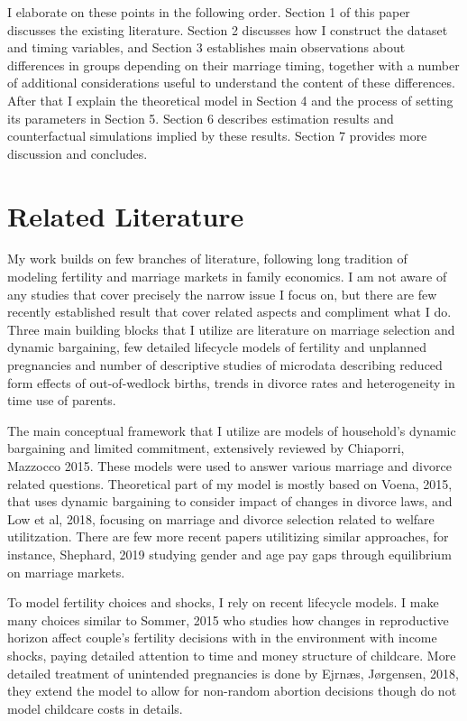\documentclass[12pt,letter]{article}
\begin{document}
I elaborate on these points in the following order. Section 1 of this paper discusses the existing literature. Section 2 discusses how I construct the dataset and timing variables, and Section 3 establishes main observations about differences in groups depending on their marriage timing, together with a number of additional considerations useful to understand the content of these differences. After that I explain the theoretical model in Section 4 and the process of setting its parameters in Section 5. Section 6 describes estimation results and counterfactual simulations implied by these results. Section 7 provides more discussion and concludes.

\section{Related Literature}

My work builds on few branches of literature, following long tradition of modeling fertility and marriage markets in family economics. I am not aware of any studies that cover precisely the narrow issue I focus on, but there are few recently established result that cover related aspects and compliment what I do. Three main building blocks that I utilize are literature on marriage selection and dynamic bargaining, few detailed lifecycle models of fertility and unplanned pregnancies and number of descriptive studies of microdata describing reduced form effects of out-of-wedlock births, trends in divorce rates and heterogeneity in time use of parents.

The main conceptual framework that I utilize are models of household's dynamic bargaining and limited commitment, extensively reviewed by Chiaporri, Mazzocco 2015.\nocite{chiappori-review} These models were used to answer various marriage and divorce related questions. Theoretical part of my model is mostly based on Voena, 2015\nocite{voena-1}, that uses dynamic bargaining to consider impact of changes in divorce laws, and Low et al, 2018\nocite{low-1}, focusing on marriage and divorce selection related to welfare utilitzation. There are few more recent papers utilitizing similar approaches, for instance, Shephard, 2019\nocite{shephard} studying gender and age pay gaps through equilibrium on marriage markets. 

To model fertility choices and shocks, I rely on recent lifecycle models. I make many choices similar to Sommer, 2015\nocite{sommer} who studies how changes in reproductive horizon affect couple's fertility decisions with in the environment with income shocks, paying detailed attention to time and money structure of childcare. More detailed treatment of unintended pregnancies is done by Ejrnæs, Jørgensen, 2018\nocite{ejrnaes}, they extend the model to allow for non-random abortion decisions though do not model childcare costs in details. 
\end{document}
